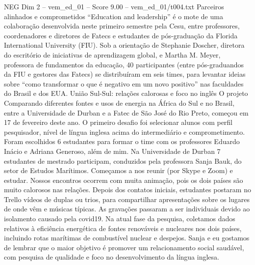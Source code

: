 \begin{textsample}{NEG Dim 2 – vem\_ed\_01 – Score 9.00 – vem\_ed\_01/t004.txt}  \label{ex:f2_neg_130}
Parceiros alinhados e comprometidos “Education and leadership” é o mote de uma colaboração desenvolvida neste primeiro semestre pela Cesu, entre professores, coordenadores e diretores de Fatecs e estudantes de pós-graduação da Florida International University (FIU).
Sob a orientação de Stephanie Doscher, diretora do escritório de iniciativas de aprendizagem global, e Martha M.
Meyer, professora de fundamentos da educação, 40 participantes (entre pós-graduandos da FIU e gestores das Fatecs) se distribuíram em seis times, para levantar ideias sobre “como transformar o que é negativo em um novo positivo” nas faculdades do Brasil e dos EUA.
União Sul-Sul: relações calorosas e foco no inglês O projeto Comparando diferentes fontes e usos de energia na África do Sul e no Brasil, entre a Universidade de Durban e a Fatec de São José do Rio Preto, começou em 17 de fevereiro deste ano.
O primeiro desafio foi selecionar alunos com perfil pesquisador, nível de língua inglesa acima do intermediário e comprometimento.
Foram escolhidos 6 estudantes para formar o time com os professores Eduardo Inácio e Adriana Generoso, além de mim.
Na Universidade de Durban 7 estudantes de mestrado participam, conduzidos pela professora Sanja Bauk, do setor de Estudos Marítimos.
Começamos a nos reunir (por Skype e Zoom) e estudar.
Nossos encontros ocorrem com muita animação, pois os dois países são muito calorosos nas relações.
Depois dos contatos iniciais, estudantes postaram no Trello vídeos de duplas ou trios, para compartilhar apresentações sobre os lugares de onde vêm e músicas típicas.
As gravações passaram a ser individuais devido ao isolamento causado pela covid19.
Na atual fase da pesquisa, coletamos dados relativos à eficiência energética de fontes renováveis e nucleares nos dois países, incluindo rotas marítimas de combustível nuclear e despejos.
Sanja e eu gostamos de lembrar que o maior objetivo é promover um relacionamento social saudável, com pesquisa de qualidade e foco no desenvolvimento da língua inglesa.

\end{textsample}
